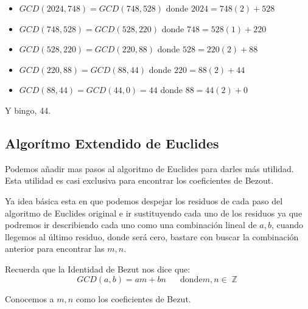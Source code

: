 \documentclass[12pt, fleqn]{report}                             %
\DeclareMathOperator \Space {\quad}                             %
\DeclareMathOperator \Integers  {\mathbb{Z}}                     %
\begin{document}
            \begin{itemize}
                \item $GCD(2024, 748) = GCD(748, 528)$   donde $2024=748(2)+528$

                \item $GCD(748, 528)  = GCD(528, 220)$   donde $748=528(1)+220$

                \item $GCD(528, 220)  = GCD(220, 88)$    donde $528=220(2)+88$

                \item $GCD(220, 88)   = GCD(88, 44)$     donde $220=88(2)+44$

                \item $GCD(88, 44)    = GCD(44, 0) = 44$ donde $88=44(2)+0$
            \end{itemize}

            Y bingo, 44.





        \clearpage
        \subsection{Algorítmo Extendido de Euclides}

            Podemos añadir mas pasos al algoritmo de Euclides para darles
            más utilidad. Esta utilidad es casi exclusiva para encontrar los
            coeficientes de Bezout.

            Ya idea básica esta en que podemos despejar los residuos de cada paso
            del algoritmo de Euclides original e ir sustituyendo cada uno de los residuos
            ya que podremos ir describiendo cada uno como una combinación lineal de $a,b$,
            cuando llegemos al último residuo, donde será cero, bastare con buscar la
            combinación anterior para encontrar las $m,n$.

            Recuerda que la Identidad de Bezut nos dice que:
            \begin{equation}
                GCD(a,b) = am +bn \Space \text{donde} m,n \in \Integers
            \end{equation}

            Conocemos a $m,n$ como los coeficientes de Bezut.
\end{document}
